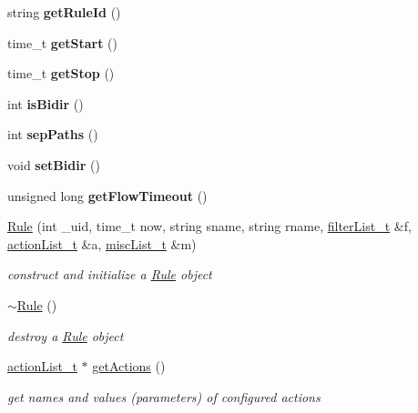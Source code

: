 \begin{DoxyCompactItemize}
string {\bfseries get\+Rule\+Id} ()
\item 
\mbox{\label{classRule_ab3f161d40bc42df2be8886ba0c4d0b6b}} 
time\+\_\+t {\bfseries get\+Start} ()
\item 
\mbox{\label{classRule_a49feb39c6002b2522d042c21f5c8afcd}} 
time\+\_\+t {\bfseries get\+Stop} ()
\item 
\mbox{\label{classRule_a80e16da3df683cb2777511fd98cfdec2}} 
int {\bfseries is\+Bidir} ()
\item 
\mbox{\label{classRule_ad6eb30b824e19044b1190beae6febebe}} 
int {\bfseries sep\+Paths} ()
\item 
\mbox{\label{classRule_af9b6211b0c4cdcbf84450718d2c65457}} 
void {\bfseries set\+Bidir} ()
\item 
\mbox{\label{classRule_af550df52b67018330bfad8b7fabd3210}} 
unsigned long {\bfseries get\+Flow\+Timeout} ()
\item 
\hyperlink{classRule_af5a5d5dedcf5fce8b376e1041df916f6}{Rule} (int \+\_\+uid, time\+\_\+t now, string sname, string rname, \hyperlink{ProcModuleInterface_8h_a2afc1e9fc63b2cfcd86ec2435f24e27c}{filter\+List\+\_\+t} \&f, \hyperlink{Rule_8h_acdc7809742ec5b554bf13b4c12053a6a}{action\+List\+\_\+t} \&a, \hyperlink{Rule_8h_a9fb303c0fc85a5e78d6d35728fe7fe74}{misc\+List\+\_\+t} \&m)
\begin{DoxyCompactList}\small\item\em construct and initialize a \hyperlink{classRule}{Rule} object \end{DoxyCompactList}\item 
\mbox{\label{classRule_a92760fc705b3da696f86e42b77943c21}} 
\hyperlink{classRule_a92760fc705b3da696f86e42b77943c21}{$\sim$\+Rule} ()
\begin{DoxyCompactList}\small\item\em destroy a \hyperlink{classRule}{Rule} object \end{DoxyCompactList}\item 
\hyperlink{Rule_8h_acdc7809742ec5b554bf13b4c12053a6a}{action\+List\+\_\+t} $\ast$ \hyperlink{classRule_a2537cf47f367282809a66f9bfb733020}{get\+Actions} ()
\begin{DoxyCompactList}\small\item\em get names and values (parameters) of configured actions \end{DoxyCompactList}\item 

\end{DoxyCompactItemize}
